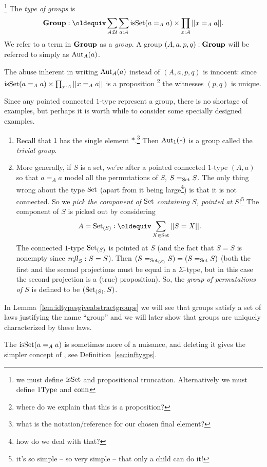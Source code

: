 \begin{definition}\label{def:typegroup}\footnote{we must define  $\mathrm{isSet}$ and propositional truncation.  Alternatively we must define $\mathrm{1Type}$ and $\mathrm{conn}$}
  The {\em type of groups} is
$$\typegroup\defequi\sum_{A:\mathcal U}\sum_{a:A}\isset(a=_Aa)\times\prod_{x:A}||x=_Aa||.$$
We refer to a term in $\mathbf{Group}$ as a {\em group}.  A group $(A,a,p,q):\mathbf{Group}$ will be referred to simply as $\mathrm{Aut}_A(a)$.
\end{definition}
\begin{remark}\label{rem:aut}
The abuse inherent in writing $\mathrm{Aut}_A(a)$ instead of $(A,a,p,q)$ is innocent: since $\mathrm{isSet}(a=_Aa)\times\prod_{x:A}||x=_Aa||$ is a proposition  \footnote{where do we explain that this is a proposition?}  the witnesses $(p,q)$  is unique. 
\end{remark}
\begin{example}
  Since any pointed connected $1$-type represent a group, there is no shortage of examples, but perhaps it is worth while to consider some specially designed examples.
  \begin{enumerate}
  \item Recall that $1$ has the single element $*$.\footnote{what is the notation/reference for our chosen final element?} Then $\mathrm{Aut}_1(*)$ is a group called the {\em trivial group}.
  \item More generally, if $S$ is a set, we're after a pointed connected $1$-type $(A,a)$ so that $a=_Aa$ model all the permutations of $S$, \ie $S=_{\mathord{\mathrm{Set}}}S$.  The only thing wrong about the type $\mathord{\mathrm{Set}}$ (apart from it being large\footnote{how do we deal with that?}) is that it is not connected.  So we {\em pick
 the component of $\mathord{\mathrm{Set}}$ containing $S$, pointed at $S$}!\footnote{it's so simple -- so very simple -- that only a child can do it!}  The component of $S$ is picked out by considering 
$$A=\Set_{(S)}\defequi\sum_{X\in\Set}||S=X||.$$  The connected $1$-type $\mathord{\mathrm{Set}}_{(S)}$ is pointed at $S$ (and the fact that $S=S$ is nonempty since $\mathop{{\it refl}_{S}}:S=S$).    Then $(S=_{\mathord{\mathrm{Set}}_{(S)}}S)=(S=_{\mathord{\mathrm{Set}}}S)$ (both the first and the second projections must be equal in a $\Sigma$-type, but in this case the second projection is a (true) proposition).  So, the {\em group of permutations of $S$} is defined to be $(\mathord{\mathrm{Set}}_{(S)},S)$.
  \end{enumerate}
\end{example}

\begin{remark}
In Lemma~\ref{lem:idtypesgiveabstractgroups} we will see that groups satisfy a set of laws justifying the name ``group''
and we will later show that groups are uniquely characterized by these laws.
\end{remark}
\begin{remark}
  The $\mathrm{isSet}(a=_Aa)$ is sometimes more of a nuisance, and deleting it gives the simpler concept of \aninftygp, see Definition~\ref{sec:inftygps}.
\end{remark}

